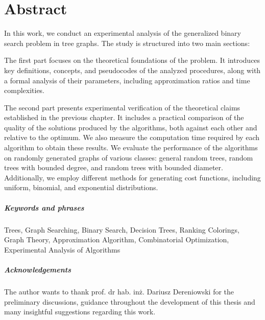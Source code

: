 \chapter*{Abstract}

In this work, we conduct an experimental analysis of the generalized binary search problem in tree graphs. 
The study is structured into two main sections:

The first part focuses on the theoretical foundations of the problem. It introduces key definitions, concepts, and pseudocodes of the analyzed procedures, along with a formal analysis of their parameters, including approximation ratios and time complexities.

The second part presents experimental verification of the theoretical claims established in the previous chapter. It includes a practical comparison of the quality of the solutions produced by the algorithms, both against each other and relative to the optimum. We also measure the computation time required by each algorithm to obtain these results. We evaluate the performance of the algorithms on randomly generated graphs of various classes: general random trees, random trees with bounded degree, and random trees with bounded diameter. Additionally, we employ different methods for generating cost functions, including uniform, binomial, and exponential distributions.

\paragraph{Keywords and phrases} Trees, Graph Searching, Binary Search, Decision Trees, Ranking Colorings, Graph
Theory, Approximation Algorithm, Combinatorial Optimization, Experimental Analysis of Algorithms


\paragraph{Acknowledgements}

The author wants to thank prof. dr hab. inż. Dariusz Dereniowski for the preliminary discussions, guidance throughout the development of this thesis and many insightful suggestions regarding this work.

